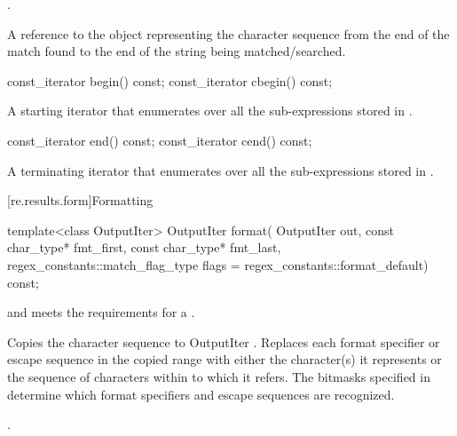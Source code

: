 \begin{itemdescr}
\pnum
\expects
{}.

\pnum
\returns
A reference to the  object representing the
character sequence from the end of the match found to the end of the
string being matched/searched.
\end{itemdescr}

%
\begin{itemdecl}
const_iterator begin() const;
const_iterator cbegin() const;
\end{itemdecl}

\begin{itemdescr}
\pnum
\returns
A starting iterator that enumerates over all the
sub-expressions stored in .
\end{itemdescr}

%
\begin{itemdecl}
const_iterator end() const;
const_iterator cend() const;
\end{itemdecl}

\begin{itemdescr}
\pnum
\returns
A terminating iterator that enumerates over all the
sub-expressions stored in .
\end{itemdescr}

[re.results.form]{Formatting}

%
\begin{itemdecl}
template<class OutputIter>
  OutputIter format(
      OutputIter out,
      const char_type* fmt_first, const char_type* fmt_last,
      regex_constants::match_flag_type flags = regex_constants::format_default) const;
\end{itemdecl}

\begin{itemdescr}
\pnum
\expects
{} and  meets the requirements for a
.

\pnum
\effects
Copies the character sequence  to
OutputIter .  Replaces each format specifier or escape
sequence in the copied range with either the character(s) it represents or
the sequence of characters within  to which it refers.
The bitmasks specified in  determine which format
specifiers and escape sequences are recognized.

\pnum
\returns
{}.
\end{itemdescr}

